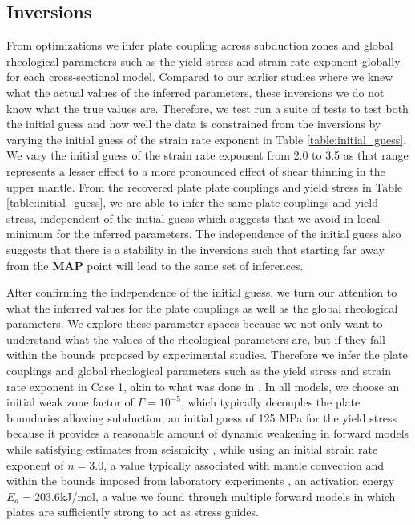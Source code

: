 \documentclass[12pt]{article}
\begin{document}
\subsection{Inversions}

From optimizations we infer plate coupling across subduction zones and global rheological parameters such as the yield stress and strain rate exponent globally for each cross-sectional model. Compared to our earlier studies \citep{ratnaswamy2015adjoint} where we knew what the actual values of the inferred parameters, these inversions we do not know what the true values are. Therefore, we test run a suite of tests to test both the initial guess and how well the data is constrained from the inversions by varying the initial guess of the strain rate exponent in Table \ref{table:initial_guess}. We vary the initial guess of the strain rate exponent from 2.0 to 3.5 as that range represents a lesser effect to a more pronounced effect of shear thinning in the upper mantle. From the recovered plate plate couplings and yield stress in Table \ref{table:initial_guess}, we are able to infer the same plate couplings and yield stress, independent of the initial guess which suggests that we avoid in local minimum for the inferred parameters. The independence of the initial guess also suggests that there is a stability in the inversions such that starting far away from the \textbf{MAP} point will lead to the same set of inferences.


After confirming the independence of the initial guess, we turn our attention to what the inferred values for the plate couplings as well as the global rheological parameters. We explore these parameter spaces because we not only want to understand what the values of the rheological parameters are, but if they fall within the bounds proposed by experimental studies. Therefore we infer the plate couplings and global rheological parameters such as the yield stress and strain rate exponent in Case 1, akin to what was done in \citep{ratnaswamy2015adjoint}.  In all models, we choose an initial weak zone factor of $\Gamma=10^{-5}$, which typically decouples the plate boundaries allowing subduction, an initial guess of 125 MPa for the yield stress because it provides a reasonable amount of dynamic weakening in forward models while satisfying estimates from seismicity \citep{craig2014reassessment}, while using an initial strain rate exponent of $n=3.0$, a value typically associated with mantle convection and within the bounds imposed from laboratory experiments \citep{ranalli1995rheology}, an activation energy $E_a=203.6$kJ/mol, a value we found through multiple forward models in which plates are sufficiently strong to act as stress guides. 
\end{document}
